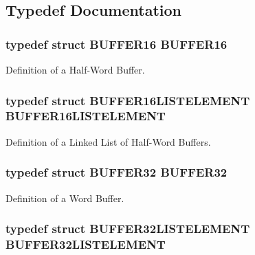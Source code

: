 \subsection{Typedef Documentation}
\hypertarget{a00654_ga6ae39c7a97b24f77641192efbb669b38}{
\subsubsection[{BUFFER16}]{\setlength{\rightskip}{0pt plus 5cm}typedef struct {\bf BUFFER16}  {\bf BUFFER16}}}
\label{a00654_ga6ae39c7a97b24f77641192efbb669b38}


Definition of a Half-\/Word Buffer. 

\hypertarget{a00654_gab4aef119192d21e626da2b0c12802f39}{
\subsubsection[{BUFFER16LISTELEMENT}]{\setlength{\rightskip}{0pt plus 5cm}typedef struct {\bf BUFFER16LISTELEMENT}  {\bf BUFFER16LISTELEMENT}}}
\label{a00654_gab4aef119192d21e626da2b0c12802f39}


Definition of a Linked List of Half-\/Word Buffers. 

\hypertarget{a00654_ga5be842975bd489db6d6d6af54e8114fd}{
\subsubsection[{BUFFER32}]{\setlength{\rightskip}{0pt plus 5cm}typedef struct {\bf BUFFER32}  {\bf BUFFER32}}}
\label{a00654_ga5be842975bd489db6d6d6af54e8114fd}


Definition of a Word Buffer. 

\hypertarget{a00654_ga9c77331cdbe545e46e5adaaf848b1170}{
\subsubsection[{BUFFER32LISTELEMENT}]{\setlength{\rightskip}{0pt plus 5cm}typedef struct {\bf BUFFER32LISTELEMENT}  {\bf BUFFER32LISTELEMENT}}}
\label{a00654_ga9c77331cdbe545e46e5adaaf848b1170}



